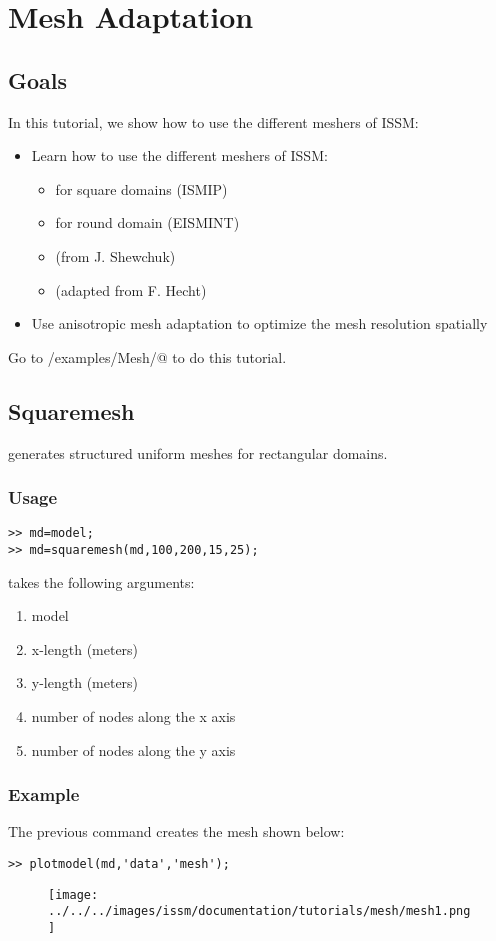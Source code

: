 \section{Mesh Adaptation}
\subsection{Goals} %
In this tutorial, we show how to use the different meshers of ISSM:
\begin{itemize}
	\item Learn how to use the different meshers of ISSM:
		\begin{itemize}
			\item \verb@squaremesh@ for square domains (ISMIP)
			\item \verb@roundmesh@ for round domain (EISMINT)
			\item \verb@triangle@ (from J. Shewchuk)
			\item \verb@bamg@ (adapted from F. Hecht)
		\end{itemize}
	\item Use anisotropic mesh adaptation to optimize the mesh resolution spatially
\end{itemize}
Go to \verb@trunk/examples/Mesh/@ to do this tutorial.
\subsection{Squaremesh}%
\verb@squaremesh@ generates structured uniform meshes for rectangular domains.
\subsubsection{Usage}
\begin{verbatim}>> md=model;
>> md=squaremesh(md,100,200,15,25);
\end{verbatim}
\verb@squaremesh@ takes the following arguments:
\begin{enumerate}
	\item model
	\item x-length (meters)
	\item y-length (meters)
	\item number of nodes along the x axis
	\item number of nodes along the y axis
\end{enumerate}
\subsubsection{Example}
The previous command creates the mesh shown below:
\begin{verbatim}>> plotmodel(md,'data','mesh');\end{verbatim}
\begin{figure}[H]
	\begin{center}
		\texttt{[image: ../../../images/issm/documentation/tutorials/mesh/mesh1.png]}
	\end{center}
\end{figure}
